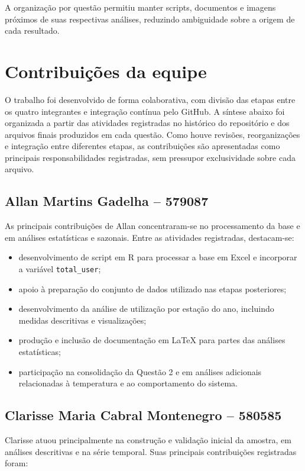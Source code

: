 \documentclass[12pt,oneside,a4paper,english,brazil]{abntex2}
\begin{document}
A organização por questão permitiu manter scripts, documentos e imagens próximos de suas respectivas análises, reduzindo ambiguidade sobre a origem de cada resultado.


\chapter{Contribuições da equipe}

O trabalho foi desenvolvido de forma colaborativa, com divisão das etapas entre os quatro integrantes e integração contínua pelo GitHub. A síntese abaixo foi organizada a partir das atividades registradas no histórico do repositório e dos arquivos finais produzidos em cada questão. Como houve revisões, reorganizações e integração entre diferentes etapas, as contribuições são apresentadas como principais responsabilidades registradas, sem pressupor exclusividade sobre cada arquivo.

\section{Allan Martins Gadelha -- 579087}

As principais contribuições de Allan concentraram-se no processamento da base e em análises estatísticas e sazonais. Entre as atividades registradas, destacam-se:

\begin{itemize}[leftmargin=1.2cm]
\item desenvolvimento de script em R para processar a base em Excel e incorporar a variável \texttt{total\_user};
\item apoio à preparação do conjunto de dados utilizado nas etapas posteriores;
\item desenvolvimento da análise de utilização por estação do ano, incluindo medidas descritivas e visualizações;
\item produção e inclusão de documentação em LaTeX para partes das análises estatísticas;
\item participação na consolidação da Questão 2 e em análises adicionais relacionadas à temperatura e ao comportamento do sistema.
\end{itemize}

\section{Clarisse Maria Cabral Montenegro -- 580585}

Clarisse atuou principalmente na construção e validação inicial da amostra, em análises descritivas e na série temporal. Suas principais contribuições registradas foram:
\end{document}
